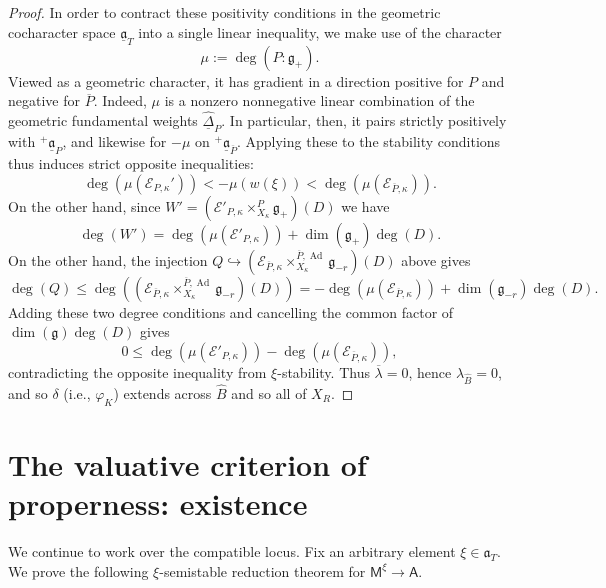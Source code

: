 \documentclass[openany]{amsbook}
\theoremstyle{definition}
\theoremstyle{remark}
\numberwithin{equation}{section}
\newcommand{\cE}{\mathcal{E}}
\newcommand{\ol}[1]{\overline{#1}}
\newcommand{\ul}[1]{\underline{#1}}
\renewcommand{\phi}{\varphi}
\renewcommand{\-}{\operatorname{-}}
\renewcommand{\a}{\mathfrak{a}}
\newcommand{\on}[1]{\operatorname{#1}}
\newcommand{\bM}{\mathsf{M}}
\newcommand{\bA}{\mathsf{A}}
\renewcommand{\fg}{\mathfrak{g}}
\newcommand{\ga}{\ul{\a}}
\newcommand{\gobtcone}{{}^+ \ul{\a}}
\begin{document}
\begin{proof}
In order to contract these positivity conditions in the geometric cocharacter space $\ga_T$ into a single linear inequality, we make use of the character
$$
    \mu := \deg(P : \fg_+).
$$
Viewed as a geometric character, it has gradient in a direction positive for $P$ and negative for $\ol{P}$. Indeed, $\mu$ is a nonzero nonnegative linear combination of the geometric fundamental weights $\hat{\ul{\Delta}}_P$. In particular, then, it pairs strictly positively with $\gobtcone_P$, and likewise for $-\mu$ on $\gobtcone_{\ol{P}}$. Applying these to the stability conditions thus induces strict opposite inequalities:
\[
    \deg(\mu(\cE_{P,\kappa}')) < - \mu(w(\xi)) < \deg(\mu(\cE_{\ol{P},\kappa})).
\]
On the other hand, since $W' = (\cE'_{P, \kappa} \times^{P}_{X_\kappa} \fg_+)(D)$ we have $$\deg(W') = \deg(\mu(\cE'_{P, \kappa}))+ \dim(\fg_+)\deg(D).$$ 
On the other hand, the injection $Q \hookrightarrow (\cE_{\ol{P},\kappa} \times_{X_\kappa}^{\ol{P}, \on{Ad}} \fg_{-r})(D)$ above gives
$$
    \deg(Q) \le \deg((\cE_{\ol{P},\kappa} \times_{X_\kappa}^{\ol{P}, \on{Ad}} \fg_{-r})(D)) = - \deg(\mu(\cE_{\ol{P}, \kappa})) + \dim(\fg_{-r})\deg(D).
$$
Adding these two degree conditions and cancelling the common factor of $\dim(\fg) \deg(D)$ gives
$$
    0 \le \deg(\mu(\cE'_{P,\kappa})) - \deg(\mu(\cE_{\ol{P},\kappa})),
$$
contradicting the opposite inequality from $\xi$-stability. Thus $\ol{\lambda} = 0$, hence $\lambda_{\widehat{B}} = 0$, and so $\delta$ (i.e., $\phi_K$) extends across $\widehat{B}$ and so all of $X_R$.
\end{proof}










\chapter{The valuative criterion of properness: existence}\label{sect.val.exist}

We continue to work over the compatible locus. Fix an arbitrary element $\xi \in \a_T$. We prove the following $\xi$-semistable reduction theorem for $\bM^\xi \to \bA$.
\end{document}
